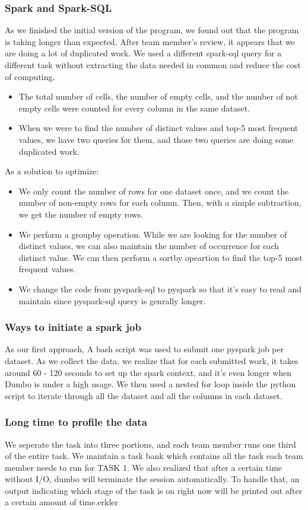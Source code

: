 \documentclass[sigconf]{acmart}
\begin{document}
\subsubsection{Spark and Spark-SQL}
As we finished the initial version of the program, we found out that the program is taking longer than expected. After team member's review, it appears that we are doing a lot of duplicated work. We used a different spark-sql query for a different task without extracting the data needed in common and reduce the cost of computing.
\begin{itemize}
    \item The total number of cells, the number of empty cells, and the number of not empty cells were counted for every column in the same dataset.
    \item When we were to find the number of distinct values and top-5 most frequent values, we have two queries for them, and those two queries are doing some duplicated work.
\end{itemize}
As a solution to optimize:
\begin{itemize}
    \item We only count the number of rows for one dataset once, and we count the number of non-empty rows for each column. Then, with a simple subtraction, we get the number of empty rows.
    \item We perform a groupby operation. While we are looking for the number of distinct values, we can also maintain the number of occurrence for each distinct value. We can then perform a sortby opeartion to find the top-5 most frequent values.
    \item We change the code from pyspark-sql to pyspark so that it's easy to read and maintain since pyspark-sql query is genrally longer.
\end{itemize}
\subsubsection{Ways to initiate a spark job}
As our first approach, A bash script was used to submit one pyspark job per dataset. As we collect the data, we realize that for each submitted work, it takes around 60 - 120 seconds to set up the spark context, and it's even longer when Dumbo is under a high usage. 
We then used a nested for loop inside the python script to iterate through all the dataset and all the columns in each dataset.
\subsubsection{Long time to profile the data}
We seperate the task into three portions, and each team member runs one third of the entire task. We maintain a task bank which contains all the task each team member needs to run for TASK 1. We also realized that after a certain time without I/O, dumbo will terminate the session automatically. To handle that, an output indicating which stage of the task is on right now will be printed out after a certain amount of time.erkler
\end{document}
